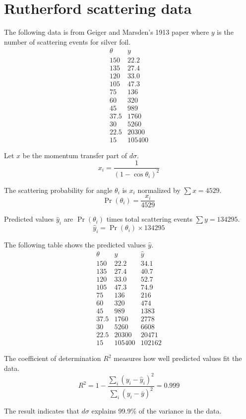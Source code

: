 

\section*{Rutherford scattering data}

The following data is from Geiger and Marsden's 1913 paper where
$y$ is the number of scattering events for silver foil.
\begin{equation*}
\begin{matrix}
\theta & y\\
150 & 22.2\\
135 & 27.4\\
120 & 33.0\\
105 & 47.3\\
75 & 136\\
60 & 320\\
45 & 989\\
37.5 & 1760\\
30 & 5260\\
22.5 & 20300\\
15 & 105400
\end{matrix}
\end{equation*}

Let $x$ be the momentum transfer part of $d\sigma$.
\begin{equation*}
x_i=\frac{1}{(1-\cos\theta_i)^2}
\end{equation*}

The scattering probability for angle $\theta_i$ is $x_i$ normalized by $\sum x=4529$.
\begin{equation*}
\Pr(\theta_i)=\frac{x_i}{4529}
\end{equation*}

Predicted values $\hat y_i$ are $\Pr(\theta_i)$
times total scattering events $\sum y=134295$.
\begin{equation*}
\hat y_i=\Pr(\theta_i)\times134295
\end{equation*}

The following table shows the predicted values $\hat y$.
\begin{equation*}
\begin{matrix}
\theta & y & \hat y\\
150 & 22.2 & 34.1\\
135 & 27.4 & 40.7\\
120 & 33.0 & 52.7\\
105 & 47.3 & 74.9\\
75 & 136 & 216\\
60 & 320 & 474\\
45 & 989 & 1383\\
37.5 & 1760 & 2778\\
30 & 5260 & 6608\\
22.5 & 20300 & 20471\\
15 & 105400 & 102162
\end{matrix}
\end{equation*}

The coefficient of determination $R^2$ measures how well predicted values fit the data.
\begin{equation*}
R^2=1-\frac{\sum_i(y_i-\hat y_i)^2}{\sum_i(y_i-\bar y)^2}=0.999
\end{equation*}

The result indicates that $d\sigma$ explains 99.9\%
of the variance in the data.


